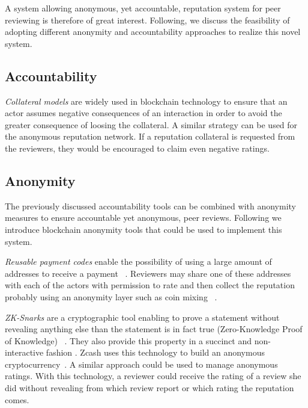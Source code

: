 A system allowing anonymous, yet accountable, reputation system for peer
reviewing is therefore of great interest. Following, we discuss the feasibility
of adopting different anonymity and accountability approaches to realize this
novel system.

\subsection*{Accountability}

\emph{Collateral models} are widely used in blockchain technology to ensure that
an actor assumes negative consequences of an interaction in order to avoid the
greater consequence of loosing the collateral. A similar strategy can be used
for the anonymous reputation network. If a reputation collateral is requested
from the reviewers, they would be encouraged to claim even negative ratings.

\subsection*{Anonymity}


The previously discussed accountability tools can be combined with anonymity
measures to ensure accountable yet anonymous, peer reviews. Following we
introduce blockchain anonymity tools that could be used to implement this
system.

\emph{Reusable payment codes} enable the possibility of using a large amount of
addresses to receive a payment ~\cite{harrigan2016unreasonable,
  ranvierReusable}. Reviewers may share one of these addresses with each of the
actors with permission to rate and then collect the reputation probably using an
anonymity layer such as coin mixing ~\cite{meiklejohn2015privacy}.

\emph{ZK-Snarks} are a cryptographic tool enabling to prove a statement without
revealing anything else than the statement is in fact true (Zero-Knowledge Proof
of Knowledge) ~\cite{blum1988non,bitansky2013succinct}. They also provide this
property in a succinct and non-interactive fashion . Zcash uses this technology to build an anonymous
cryptocurrency~\cite{sasson2014zerocash}. A similar approach could be used to
manage anonymous ratings. With this technology, a reviewer could receive the
rating of a review she did without revealing from which review report or which
rating the reputation comes.
